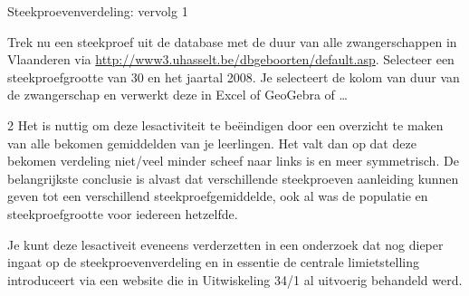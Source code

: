 \begin{lesactiviteit}{Steekproevenverdeling: vervolg 1}

 Trek nu een steekproef uit de database met de duur van alle zwangerschappen in Vlaanderen via \url{http://www3.uhasselt.be/dbgeboorten/default.asp}. Selecteer een steekproefgrootte van 30 en het jaartal 2008. Je selecteert de kolom van duur van de zwangerschap en verwerkt deze in Excel of GeoGebra of \ldots
 
 \begin{vraagenantwoord} 
 
    

    
    
    
\end{vraagenantwoord}
\end{lesactiviteit}
\begin{multicols}{2}
Het is nuttig om deze lesactiviteit te be\"eindigen door een overzicht te maken van alle bekomen gemiddelden van je leerlingen. Het valt dan op dat deze bekomen verdeling niet/veel minder scheef naar links is en meer symmetrisch. De belangrijkste conclusie is alvast dat verschillende steekproeven aanleiding kunnen geven tot een verschillend steekproefgemiddelde, ook al was de populatie en steekproefgrootte voor iedereen hetzelfde.
     
Je kunt deze lesactiveit eveneens verderzetten in een onderzoek dat nog dieper ingaat op de steekproevenverdeling en in essentie de centrale limietstelling introduceert via een website die in Uitwiskeling 34/1 al uitvoerig behandeld werd.
\end{multicols}
